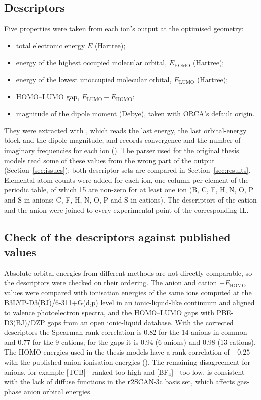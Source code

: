 \subsection{Descriptors}
Five properties were taken from each ion's output at the optimised geometry:
\begin{itemize}
    \item total electronic energy $E$ (Hartree);
    \item energy of the highest occupied molecular orbital, $E_{\mathrm{HOMO}}$ (Hartree);
    \item energy of the lowest unoccupied molecular orbital, $E_{\mathrm{LUMO}}$ (Hartree);
    \item HOMO--LUMO gap, $E_{\mathrm{LUMO}} - E_{\mathrm{HOMO}}$;
    \item magnitude of the dipole moment (Debye), taken with ORCA's default origin.
\end{itemize}
They were extracted with , which reads the last energy, the last orbital-energy block and the dipole magnitude, and records convergence and the number of imaginary frequencies for each ion (). The parser used for the original thesis models read some of these values from the wrong part of the output (Section~\ref{sec:issues}); both descriptor sets are compared in Section~\ref{sec:results}. Elemental atom counts were added for each ion, one column per element of the periodic table, of which 15 are non-zero for at least one ion (B, C, F, H, N, O, P and S in anions; C, F, H, N, O, P and S in cations). The descriptors of the cation and the anion were joined to every experimental point of the corresponding IL.

\subsection{Check of the descriptors against published values}
\label{sec:desc-check}
Absolute orbital energies from different methods are not directly comparable, so the descriptors were checked on their ordering. The anion and cation $-E_{\mathrm{HOMO}}$ values were compared with ionisation energies of the same ions computed at the B3LYP-D3(BJ)/6-311+G(d,p) level in an ionic-liquid-like continuum and aligned to valence photoelectron spectra\cite{fogarty2025dos}, and the HOMO--LUMO gaps with PBE-D3(BJ)/DZP gaps from an open ionic-liquid database\cite{stavarache2026xtb}. With the corrected descriptors the Spearman rank correlation is 0.82 for the 14 anions in common and 0.77 for the 9 cations; for the gaps it is 0.94 (6 anions) and 0.98 (13 cations). The HOMO energies used in the thesis models have a rank correlation of $-0.25$ with the published anion ionisation energies (). The remaining disagreement for anions, for example [TCB]$^-$ ranked too high and [BF$_4$]$^-$ too low, is consistent with the lack of diffuse functions in the r2SCAN-3c basis set, which affects gas-phase anion orbital energies.
